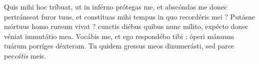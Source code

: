 \lettrine{Q}{}uis mihi hoc tríbuat, ut in inférno prótegas me, et abscóndas me donec pertránseat furor tuus, et constítuas mihi tempus in quo recordéris mei ?
Putásne mórtuus homo rursum vivat ? cunctis diébus quibus nunc mílito, expécto donec véniat immutátio mea.
Vocábis me, et ego respondébo tibi : óperi mánuum tuárum porríges déxteram.
Tu quidem gressus meos dinumerásti, sed parce pec\textit{cátis} meis.